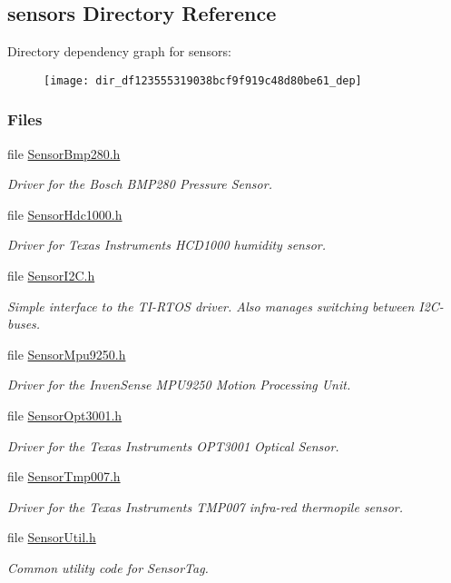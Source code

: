 \subsection{sensors Directory Reference}
\label{dir_df123555319038bcf9f919c48d80be61}
Directory dependency graph for sensors\+:
\nopagebreak
\begin{figure}[H]
\begin{center}
\leavevmode
\texttt{[image: dir\_df123555319038bcf9f919c48d80be61\_dep]}
\end{center}
\end{figure}
\subsubsection*{Files}
\begin{DoxyCompactItemize}
\item 
file \hyperlink{_sensor_bmp280_8h}{Sensor\+Bmp280.\+h}
\begin{DoxyCompactList}\small\item\em Driver for the Bosch B\+M\+P280 Pressure Sensor. \end{DoxyCompactList}\item 
file \hyperlink{_sensor_hdc1000_8h}{Sensor\+Hdc1000.\+h}
\begin{DoxyCompactList}\small\item\em Driver for Texas Instruments H\+C\+D1000 humidity sensor. \end{DoxyCompactList}\item 
file \hyperlink{_sensor_i2_c_8h}{Sensor\+I2\+C.\+h}
\begin{DoxyCompactList}\small\item\em Simple interface to the T\+I-\/\+R\+T\+O\+S driver. Also manages switching between I2\+C-\/buses. \end{DoxyCompactList}\item 
file \hyperlink{_sensor_mpu9250_8h}{Sensor\+Mpu9250.\+h}
\begin{DoxyCompactList}\small\item\em Driver for the Inven\+Sense M\+P\+U9250 Motion Processing Unit. \end{DoxyCompactList}\item 
file \hyperlink{_sensor_opt3001_8h}{Sensor\+Opt3001.\+h}
\begin{DoxyCompactList}\small\item\em Driver for the Texas Instruments O\+P\+T3001 Optical Sensor. \end{DoxyCompactList}\item 
file \hyperlink{_sensor_tmp007_8h}{Sensor\+Tmp007.\+h}
\begin{DoxyCompactList}\small\item\em Driver for the Texas Instruments T\+M\+P007 infra-\/red thermopile sensor. \end{DoxyCompactList}\item 
file \hyperlink{_sensor_util_8h}{Sensor\+Util.\+h}
\begin{DoxyCompactList}\small\item\em Common utility code for Sensor\+Tag. \end{DoxyCompactList}\end{DoxyCompactItemize}
